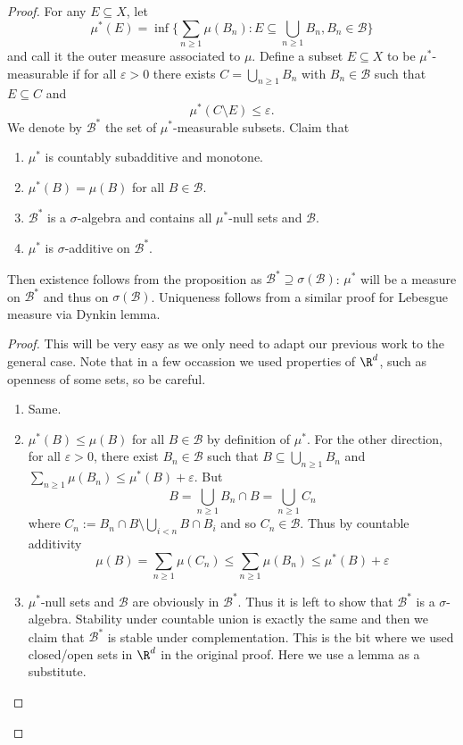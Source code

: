 \documentclass[a4paper]{article}
\begin{document}
\begin{proof}
  For any \(E \subseteq X\), let
  \[
    \mu^*(E) = \inf \{\sum_{n \geq 1} \mu(B_n): E \subseteq \bigcup_{n \geq 1} B_n, B_n \in \mathcal B\}
  \]
  and call it the outer measure associated to \(\mu\). Define a subset \(E \subseteq X\) to be \(\mu^*\)-measurable if for all \(\varepsilon > 0\) there exists \(C = \bigcup_{n \geq 1} B_n\) with \(B_n \in \mathcal B\) such that \(E \subseteq C\) and
  \[
    \mu^*(C \setminus E) \leq \varepsilon.
  \]
  We denote by \(\mathcal B^*\) the set of \(\mu^*\)-measurable subsets. Claim that
  \begin{enumerate}
  \item \(\mu^*\) is countably subadditive and monotone.
  \item \(\mu^*(B) = \mu(B)\) for all \(B \in \mathcal B\).
  \item \(\mathcal B^*\) is a \(\sigma\)-algebra and contains all \(\mu^*\)-null sets and \(\mathcal B\).
  \item \(\mu^*\) is \(\sigma\)-additive on \(\mathcal B^*\).
  \end{enumerate}

  Then existence follows from the proposition as \(\mathcal B^* \supseteq \sigma(\mathcal B)\): \(\mu^*\) will be a measure on \(\mathcal B^*\) and thus on \(\sigma(\mathcal B)\). Uniqueness follows from a similar proof for Lebesgue measure via Dynkin lemma.

  \begin{proof}
    This will be very easy as we only need to adapt our previous work to the general case. Note that in a few occassion we used properties of \(\R^d\), such as openness of some sets, so be careful.
    \begin{enumerate}
    \item Same.
    \item \(\mu^*(B) \leq \mu(B)\) for all \(B \in \mathcal B\) by definition of \(\mu^*\). For the other direction, for all \(\varepsilon > 0\), there exist \(B_n \in \mathcal B\) such that \(B \subseteq \bigcup_{n \geq 1} B_n\) and \(\sum_{n \geq 1} \mu(B_n) \leq \mu^*(B) + \varepsilon\). But
      \[
        B = \bigcup_{n \geq 1} B_n \cap B = \bigcup_{n \geq 1} C_n
      \]
      where \(C_n := B_n \cap B \setminus \bigcup_{i < n} B\cap B_i\) and so \(C_n \in \mathcal B\). Thus by countable additivity
      \[
        \mu(B)
        = \sum_{n \geq 1} \mu(C_n)
        \leq \sum_{n \geq 1} \mu(B_n)
        \leq \mu^*(B) + \varepsilon
      \]
    \item \(\mu^*\)-null sets and \(\mathcal B\) are obviously in \(\mathcal B^*\). Thus it is left to show that \(\mathcal B^*\) is a \(\sigma\)-algebra. Stability under countable union is exactly the same and then we claim that \(\mathcal B^*\) is stable under complementation. This is the bit where we used closed/open sets in \(\R^d\) in the original proof. Here we use a lemma as a substitute.


\end{enumerate}
\end{proof}
\end{proof}
\end{document}
